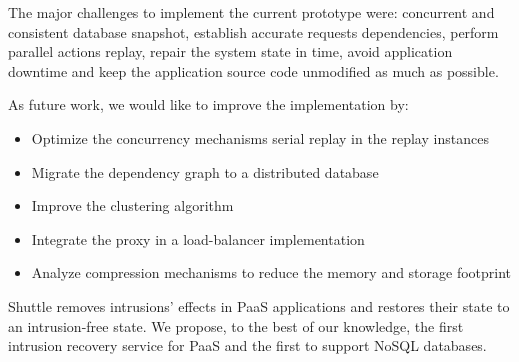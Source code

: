 The major challenges to implement the current prototype were: concurrent and consistent database snapshot, establish accurate requests dependencies, perform parallel actions replay, repair the system state in time, avoid application downtime and keep the application source code unmodified as much as possible.

As future work, we would like to improve the implementation by:
\begin{itemize}
\item Optimize the concurrency mechanisms serial replay in the replay instances
\item Migrate the dependency graph to a distributed database
\item Improve the clustering algorithm
\item Integrate the proxy in a load-balancer implementation
\item Analyze compression mechanisms to reduce the memory and storage footprint
\end{itemize}


Shuttle removes intrusions' effects in \ac{PaaS} applications and restores their state to an intrusion-free state. We propose, to the best of our knowledge, the first intrusion recovery service for \ac{PaaS} and the first to support \acs{NoSQL} databases.
